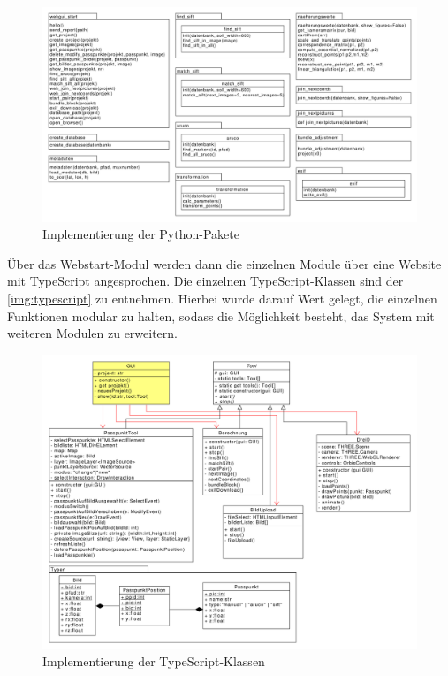 \documentclass[a4paper,12pt,bibliography=totoc, listof=totoc,titlepage]{scrreprt}
\begin{document}
\begin{figure}[!htbp]
    \centering
    \includegraphics[width=1\textwidth]{./img/python.pdf}
    \centering
    \caption{Implementierung der Python-Pakete} %
    \label{img:python} %
\end{figure}

Über das Webstart-Modul werden dann die einzelnen Module über eine Website mit TypeScript angesprochen. Die einzelnen TypeScript-Klassen sind der \autoref{img:typescript} zu entnehmen. Hierbei wurde darauf Wert gelegt, die einzelnen Funktionen modular zu halten, sodass die Möglichkeit besteht, das System mit weiteren Modulen zu erweitern.

\begin{figure}[!htbp]
    \centering
    \includegraphics[width=1\textwidth]{./img/typescript.pdf}
    \centering
    \caption{Implementierung der TypeScript-Klassen} %
    \label{img:typescript} %
\end{figure}
\end{document}
